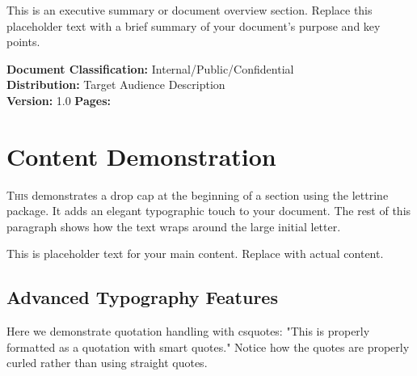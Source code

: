\documentclass[a4paper,11pt]{article}
\begin{document}
\maketitle
\thispagestyle{empty}

\begin{infobox}
This is an executive summary or document overview section. Replace this placeholder text with a brief summary of your document's purpose and key points.
\end{infobox}

\vfill
\begin{center}
\color{textgray}\footnotesize\sffamily
\textbf{Document Classification:} Internal/Public/Confidential\\
\textbf{Distribution:} Target Audience Description\\
\textbf{Version:} 1.0 \quad \textbf{Pages:} \pageref{LastPage}
\end{center}

\newpage

\tableofcontents
\newpage


\section{Content Demonstration}

\lettrine[lines=3, loversize=0.1]{T}{his} demonstrates a drop cap at the beginning of a section using the lettrine package. It adds an elegant typographic touch to your document. The rest of this paragraph shows how the text wraps around the large initial letter.

This is placeholder text for your main content. Replace with actual content.

\subsection{Advanced Typography Features}

Here we demonstrate quotation handling with csquotes: "This is properly formatted as a quotation with smart quotes." Notice how the quotes are properly curled rather than using straight quotes.
\end{document}
